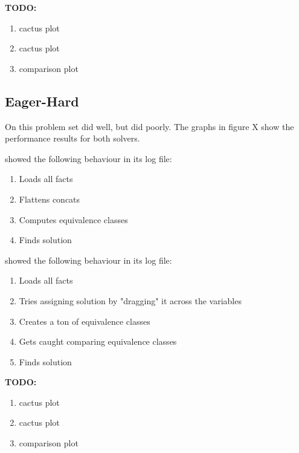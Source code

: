         \textbf{TODO:}

        \begin{enumerate}
            \item \us{} cactus plot
            \item \cvc{} cactus plot
            \item comparison plot
        \end{enumerate}

    \subsection{Eager-Hard}

        On this problem set \cvc{} did well, but \us{} did poorly. The graphs in figure X show the performance results for both solvers.

        \cvc{} showed the following behaviour in its log file:

        \begin{enumerate}
            \item Loads all facts
            \item Flattens concats
            \item Computes equivalence classes
            \item Finds solution
        \end{enumerate}

        \us{} showed the following behaviour in its log file:

        \begin{enumerate}
            \item Loads all facts
            \item Tries assigning solution by "dragging" it across the variables
            \item Creates a ton of equivalence classes
            \item Gets caught comparing equivalence classes
            \item Finds solution
        \end{enumerate}

        \textbf{TODO:}

        \begin{enumerate}
            \item \us{} cactus plot
            \item \cvc{} cactus plot
            \item comparison plot
        \end{enumerate}

